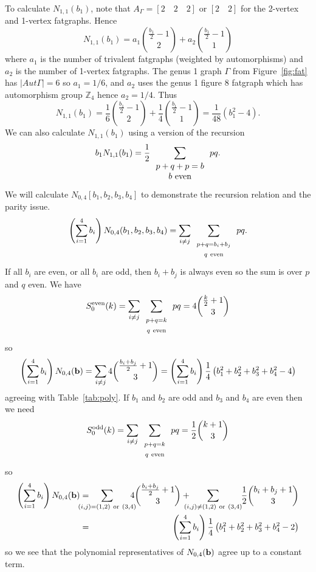 \documentclass{amsart}
\newcommand{\bz}{\mathbb{Z}}
\begin{document}
To calculate $N_{1,1}(b_1)$, note that $A_{\Gamma}=[2\quad 2\quad 2]$ or $[2\quad 2]$ for the 2-vertex and 1-vertex fatgraphs.  Hence
\[ N_{1,1}(b_1)=a_1\binom{\frac{b_1}{2}-1}{2}+a_2\binom{\frac{b_1}{2}-1}{1}\]
where $a_1$ is the number of trivalent fatgraphs (weighted by automorphisms) and $a_2$ is the number of 1-vertex fatgraphs.  The genus 1 graph $\Gamma$ from Figure~\ref{fig:fat} has $|Aut\Gamma|=6$ so $a_1=1/6$, and $a_2$ uses the genus 1 figure 8 fatgraph which has automorphism group $\bz_4$ hence $a_2=1/4$.  Thus
\[ N_{1,1}(b_1)=\frac{1}{6}\binom{\frac{b_1}{2}-1}{2}+\frac{1}{4}\binom{\frac{b_1}{2}-1}{1}=\frac{1}{48}\left(b_1^2-4\right).\]
We can also calculate $N_{1,1}(b_1)$ using a version of the recursion
\[ b_1N_{1,1}(b_1)=\frac{1}{2}\sum_{\begin{array}{c}p+q+p=b\\b{\rm\ even}\end{array}}pq.\]
We will calculate $N_{0,4}[b_1,b_2,b_3,b_4]$ to demonstrate the recursion relation and the parity issue.
\[\left(\sum_{i=1}^4b_i\right)N_{0,4}(b_1,b_2,b_3,b_4)=\sum_{i\neq j}\sum_{\begin{array}{c}\scriptstyle p+q=b_i+b_j\\\scriptstyle q{\rm\ even}\end{array}}pq.\]
If all $b_i$ are even, or all $b_i$ are odd, then $b_i+b_j$ is always even so the sum is over $p$ and $q$ even.  We have
\[ S^{\rm even}_0(k)=\sum_{i\neq j}\sum_{\begin{array}{c}\scriptstyle p+q=k\\\scriptstyle q{\rm\ even}\end{array}}pq=4\binom{\frac{k}{2}+1}{3}\]
so
\[\left(\sum_{i=1}^4b_i\right)N_{0,4}({\bf b})=\sum_{i\neq j}4\binom{\frac{b_i+b_j}{2}+1}{3}=\left(\sum_{i=1}^4b_i\right)\frac{1}{4}\left(b_1^2+b_2^2+b_3^2+b_4^2-4\right)\]
agreeing with Table~\ref{tab:poly}.  If $b_1$ and $b_2$ are odd and $b_3$ and $b_4$ are even then we need
\[ S^{\rm odd}_0(k)=\sum_{i\neq j}\sum_{\begin{array}{c}\scriptstyle p+q=k\\\scriptstyle q{\rm\ even}\end{array}}pq=\frac{1}{2}\binom{k+1}{3}\]
so
\begin{eqnarray*}
\left(\sum_{i=1}^4b_i\right)N_{0,4}({\bf b})&=&
\hspace{-8mm}\sum_{(i,j)=(1,2){\rm\ or\ }(3,4)}\hspace{-3mm}4\binom{\frac{b_i+b_j}{2}+1}{3}
+\hspace{-3mm}\sum_{(i,j)\neq(1,2){\rm\ or\ }(3,4)}\hspace{-1mm}\frac{1}{2}\binom{b_i+b_j+1}{3}\\
&=&\left(\sum_{i=1}^4b_i\right)\frac{1}{4}\left(b_1^2+b_2^2+b_3^2+b_4^2-2\right)
\end{eqnarray*}
so we see that the polynomial representatives of $N_{0,4}({\bf b})$ agree up to a constant term.
\end{document}
